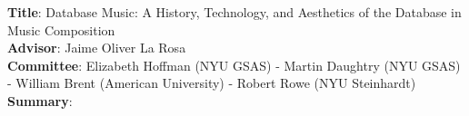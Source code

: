 \textbf{Title}:
Database Music: A History, Technology, and Aesthetics of the Database in Music Composition
\\
\textbf{Advisor}:
Jaime Oliver La Rosa
\\
\textbf{Committee}:
Elizabeth Hoffman (NYU GSAS) - Martin Daughtry (NYU GSAS) - William Brent (American University) - Robert Rowe (NYU Steinhardt)
\\
\textbf{Summary}: